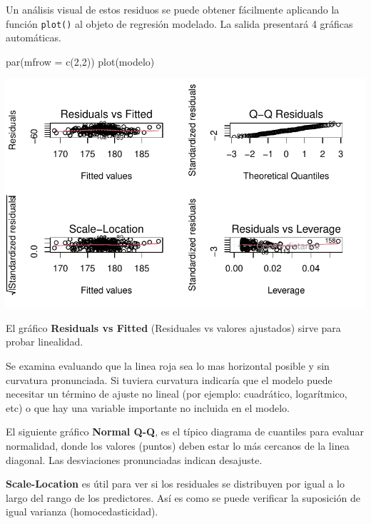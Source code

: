 \documentclass[
  letterpaper,
  DIV=11,
  numbers=noendperiod]{scrartcl}
\newenvironment{Shaded}{\begin{snugshade}}{\end{snugshade}}
\newcommand{\AttributeTok}[1]{\textcolor[rgb]{0.40,0.45,0.13}{#1}}
\newcommand{\DecValTok}[1]{\textcolor[rgb]{0.68,0.00,0.00}{#1}}
\newcommand{\FunctionTok}[1]{\textcolor[rgb]{0.28,0.35,0.67}{#1}}
\newcommand{\NormalTok}[1]{\textcolor[rgb]{0.00,0.23,0.31}{#1}}
\begin{document}
Un análisis visual de estos residuos se puede obtener fácilmente
aplicando la función \texttt{plot()} al objeto de regresión modelado. La
salida presentará 4 gráficas automáticas.

\begin{Shaded}
\begin{Highlighting}[]
\FunctionTok{par}\NormalTok{(}\AttributeTok{mfrow =} \FunctionTok{c}\NormalTok{(}\DecValTok{2}\NormalTok{,}\DecValTok{2}\NormalTok{))}
\FunctionTok{plot}\NormalTok{(modelo)}
\end{Highlighting}
\end{Shaded}

\begin{center}
\includegraphics{index_files/figure-pdf/unnamed-chunk-30-1.pdf}
\end{center}

El gráfico \textbf{Residuals vs Fitted} (Residuales vs valores
ajustados) sirve para probar linealidad.

Se examina evaluando que la linea roja sea lo mas horizontal posible y
sin curvatura pronunciada. Si tuviera curvatura indicaría que el modelo
puede necesitar un término de ajuste no lineal (por ejemplo: cuadrático,
logarítmico, etc) o que hay una variable importante no incluida en el
modelo.

El siguiente gráfico \textbf{Normal Q-Q}, es el típico diagrama de
cuantiles para evaluar normalidad, donde los valores (puntos) deben
estar lo más cercanos de la linea diagonal. Las desviaciones
pronunciadas indican desajuste.

\textbf{Scale-Location} es útil para ver si los residuales se
distribuyen por igual a lo largo del rango de los predictores. Así es
como se puede verificar la suposición de igual varianza
(homocedasticidad).
\end{document}

